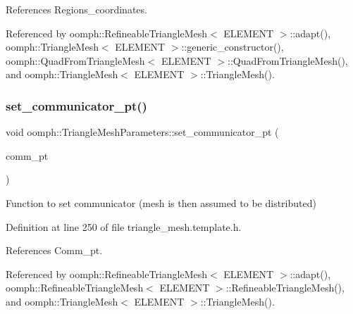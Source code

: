 References Regions\+\_\+coordinates.



Referenced by oomph\+::\+Refineable\+Triangle\+Mesh$<$ E\+L\+E\+M\+E\+N\+T $>$\+::adapt(), oomph\+::\+Triangle\+Mesh$<$ E\+L\+E\+M\+E\+N\+T $>$\+::generic\+\_\+constructor(), oomph\+::\+Quad\+From\+Triangle\+Mesh$<$ E\+L\+E\+M\+E\+N\+T $>$\+::\+Quad\+From\+Triangle\+Mesh(), and oomph\+::\+Triangle\+Mesh$<$ E\+L\+E\+M\+E\+N\+T $>$\+::\+Triangle\+Mesh().

\mbox{\label{classoomph_1_1TriangleMeshParameters_a9bcb1b69f601f277d2498c694dfb008c}} 
\subsubsection{\texorpdfstring{set\+\_\+communicator\+\_\+pt()}{set\_communicator\_pt()}}
{\footnotesize\ttfamily void oomph\+::\+Triangle\+Mesh\+Parameters\+::set\+\_\+communicator\+\_\+pt (\begin{DoxyParamCaption}\item[{\hyperlink{classoomph_1_1OomphCommunicator}{Oomph\+Communicator} $\ast$}]{comm\+\_\+pt }\end{DoxyParamCaption})\hspace{0.3cm}{\ttfamily [inline]}}



Function to set communicator (mesh is then assumed to be distributed) 



Definition at line 250 of file triangle\+\_\+mesh.\+template.\+h.



References Comm\+\_\+pt.



Referenced by oomph\+::\+Refineable\+Triangle\+Mesh$<$ E\+L\+E\+M\+E\+N\+T $>$\+::adapt(), oomph\+::\+Refineable\+Triangle\+Mesh$<$ E\+L\+E\+M\+E\+N\+T $>$\+::\+Refineable\+Triangle\+Mesh(), and oomph\+::\+Triangle\+Mesh$<$ E\+L\+E\+M\+E\+N\+T $>$\+::\+Triangle\+Mesh().

\mbox{\label{classoomph_1_1TriangleMeshParameters_a37618337c703c7bef4b6a657f12670bd}} 

